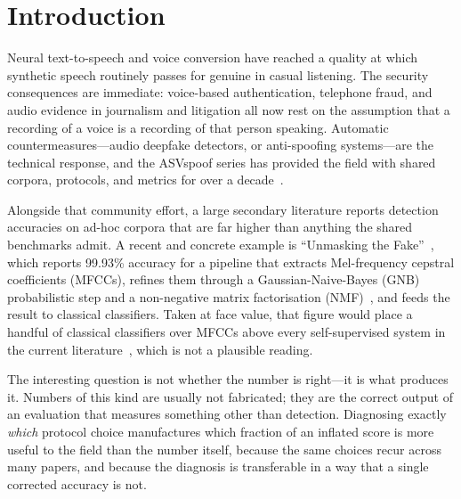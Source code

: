 \documentclass[sn-mathphys-num,pdflatex]{sn-jnl}
\begin{document}

\maketitle

\section{Introduction}\label{sec:intro}

Neural text-to-speech and voice conversion have reached a quality at which
synthetic speech routinely passes for genuine in casual listening. The security
consequences are immediate: voice-based authentication, telephone fraud, and
audio evidence in journalism and litigation all now rest on the assumption that
a recording of a voice is a recording of that person speaking. Automatic
countermeasures---audio deepfake detectors, or anti-spoofing
systems---are the technical response, and the ASVspoof series has provided the
field with shared corpora, protocols, and metrics for over a
decade~\cite{asvspoof19,asvspoof21,asvspoof21journal}.

Alongside that community effort, a large secondary literature reports detection
accuracies on ad-hoc corpora that are far higher than anything the shared
benchmarks admit. A recent and concrete example is ``Unmasking the
Fake''~\cite{unmasking}, which reports 99.93\% accuracy for a pipeline that
extracts Mel-frequency cepstral coefficients (MFCCs), refines them through a
Gaussian-Naive-Bayes (GNB) probabilistic step and a non-negative matrix
factorisation (NMF)~\cite{nmf}, and feeds the result to classical classifiers.
Taken at face value, that figure would place a handful of classical classifiers
over MFCCs above every self-supervised system in the current
literature~\cite{wav2vec2aug,aasist}, which is not a plausible reading.

The interesting question is not whether the number is right---it is what
produces it. Numbers of this kind are usually not fabricated; they are the
correct output of an evaluation that measures something other than detection.
Diagnosing exactly \emph{which} protocol choice manufactures which fraction of
an inflated score is more useful to the field than the number itself, because
the same choices recur across many papers, and because the diagnosis is
transferable in a way that a single corrected accuracy is not.
\end{document}
